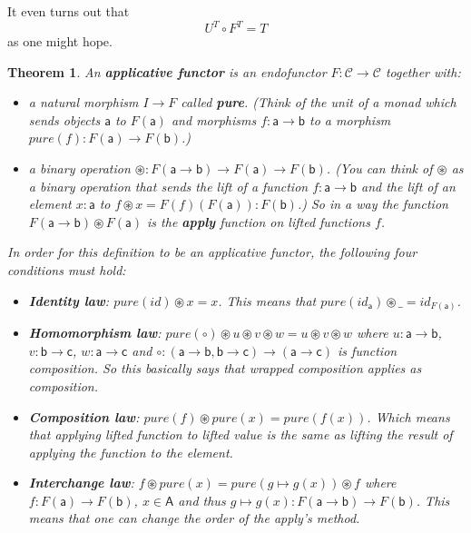 \documentclass{article}
\newcommand{\cat}[1]{\mathcal{#1}} %
\newcommand{\ob}[1]{\mathsf{#1}} %
\newtheorem{theorem}{Theorem}
\begin{document}
It even turns out that
$$U^T \circ F^T = T$$
as one might hope.

\begin{theorem}
	An \textbf{applicative functor} is an endofunctor $F: \cat{C} \rightarrow \cat{C}$ together with:
	\begin{itemize}
		\item a natural morphism $I \rightarrow F$ called \textbf{pure}. (Think of the unit of a monad which sends objects $\ob{a}$ to $F(\ob{a})$ and morphisms $f: \ob{a} \rightarrow \ob{b}$ to a morphism $pure(f): F(\ob{a}) \rightarrow F(\ob{b})$.)
		\item a binary operation $\circledast: F(\ob{a} \rightarrow \ob{b}) \rightarrow F(\ob{a}) \rightarrow F(\ob{b})$. \newline
			  (You can think of $\circledast$ as a binary operation that sends the lift of a function $f: \ob{a} \rightarrow \ob{b}$ and the lift of an element $x: \ob{a}$ to $f \circledast x = F(f)(F(\ob{a})): F(\ob{b})$.) \newline
		      So in a way the function $F(\ob{a} \rightarrow \ob{b}) \circledast F(\ob{a})$ is the \textbf{apply} function on lifted functions $f$.
	\end{itemize}
	In order for this definition to be an applicative functor, the following four conditions must hold:
	\begin{itemize}
		\item \textbf{Identity law}: $pure(id) \circledast x = x$. This means that $pure(id_\ob{a}) \circledast \_ = id_{F(\ob{a})}$.
		\item \textbf{Homomorphism law}: $pure(\circ) \circledast u \circledast v \circledast w = u \circledast v \circledast w$
		      where $u: \ob{a} \rightarrow \ob{b}$, $v: \ob{b} \rightarrow \ob{c}$, $w: \ob{a} \rightarrow \ob{c}$ and $\circ: (\ob{a} \rightarrow \ob{b}, \ob{b} \rightarrow \ob{c}) \rightarrow (\ob{a} \rightarrow \ob{c})$ is function composition.
		      So this basically says that wrapped composition applies as composition.
		\item \textbf{Composition law}: $pure(f) \circledast pure(x) = pure(f(x))$.
		      Which means that applying lifted function to lifted value is the same as lifting the result of applying the function to the element.
		\item \textbf{Interchange law}: $f \circledast pure(x) = pure(g \mapsto g(x)) \circledast f$ where $f: F(\ob{a}) \rightarrow F(\ob{b})$, $x \in \ob{A}$ and thus $g \mapsto g(x): F(\ob{a} \rightarrow \ob{b}) \rightarrow F(\ob{b})$.
		      This means that one can change the order of the apply's method.
	\end{itemize}
\end{theorem}
\end{document}
